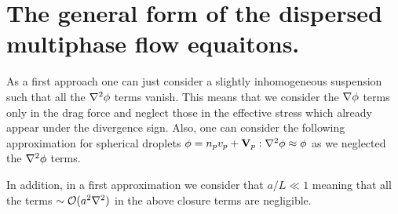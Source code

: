\section{The general form of the dispersed multiphase flow equaitons.}

As a first approach one can just consider a slightly inhomogeneous suspension such that all the $\mathbf{\nabla}^2 \phi$ terms vanish. 
This means that we consider the $\mathbf{\nabla} \phi$ terms only in the drag force and neglect those in the effective stress which already appear under the divergence sign. 
Also, one can consider the following approximation for spherical droplets $\phi = n_pv_p + \textbf{V}_p :\mathbf{\nabla}^2 \phi \approx \phi$ as we neglected the $\mathbf{\nabla}^2 \phi$ terms. 

In addition, in a first approximation we consider that $a/L \ll 1$ meaning that all the terms $\sim \mathcal{O}(a^2 \mathbf{\nabla}^2)$ in the above closure terms are negligible. 

